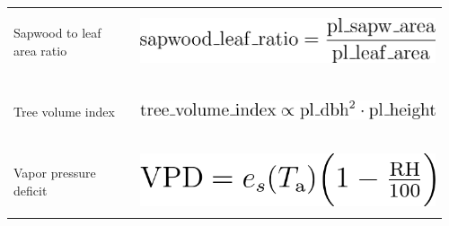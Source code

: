 \documentclass[11pt]{article}
\begin{document}
\begin{longtable}{@{}p{0.28\linewidth} p{0.68\linewidth}@{}}
Sapwood to leaf area ratio & \includegraphics[height=18mm]{figures/formulas/sapwood_to_leaf_area_ratio.png} \\
Tree volume index & \includegraphics[height=18mm]{figures/formulas/tree_volume_index.png} \\
Vapor pressure deficit & \includegraphics[height=18mm]{figures/formulas/vapor_pressure_deficit.png} \\
\end{longtable}
\end{document}
